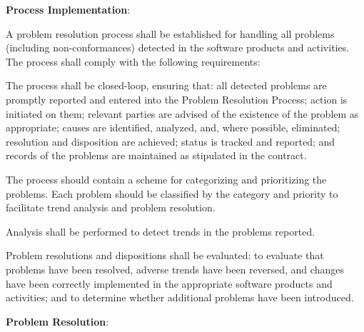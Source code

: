 			\begin{adjustwidth}{2em}{0pt} 

				\begin{compactenum}

					\item {\bf Process Implementation}:

					\begin{compactenum}

						\item A problem resolution process shall be established for handling all problems (including non-conformances) detected in the software products and activities. The process shall comply with the following requirements:

						\begin{compactenum}

							\item The process shall be closed-loop, ensuring that: all detected problems are promptly reported and entered into the Problem Resolution Process; action is initiated on them; relevant parties are advised of the existence of the problem as appropriate; causes are identified, analyzed, and, where possible, eliminated; resolution and disposition are achieved; status is tracked and reported; and records of the problems are maintained as stipulated in the contract.

							\item The process should contain a scheme for categorizing and prioritizing the problems. Each problem should be classified by the category and priority to facilitate trend analysis and problem resolution.

							\item Analysis shall be performed to detect trends in the problems reported.

							\item Problem resolutions and dispositions shall be evaluated: to evaluate that problems have been resolved, adverse trends have been reversed, and changes have been correctly implemented in the appropriate software products and activities; and to determine whether additional problems have been introduced.

						\end{compactenum}

					\end{compactenum}

					\item {\bf Problem Resolution}:


\end{compactenum}
\end{adjustwidth}
